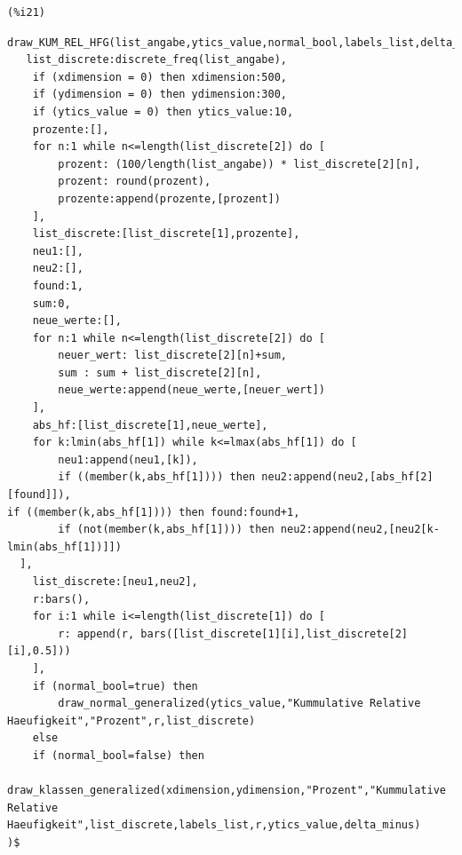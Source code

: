 \documentclass{article}
\begin{document}
\noindent
\begin{minipage}[t]{8ex}{\color{red}\bf
\begin{verbatim}
(%i21) 
\end{verbatim}}
\end{minipage}
\begin{minipage}[t]{\textwidth}{\color{blue}
\begin{verbatim}
draw_KUM_REL_HFG(list_angabe,ytics_value,normal_bool,labels_list,delta_minus,xdimension,ydimension):=block(
   list_discrete:discrete_freq(list_angabe),
    if (xdimension = 0) then xdimension:500,
    if (ydimension = 0) then ydimension:300,
    if (ytics_value = 0) then ytics_value:10,
    prozente:[],
    for n:1 while n<=length(list_discrete[2]) do [
        prozent: (100/length(list_angabe)) * list_discrete[2][n],
        prozent: round(prozent),
        prozente:append(prozente,[prozent])
    ],
    list_discrete:[list_discrete[1],prozente],
    neu1:[],
    neu2:[],
    found:1,
    sum:0,
    neue_werte:[],
    for n:1 while n<=length(list_discrete[2]) do [
        neuer_wert: list_discrete[2][n]+sum,
        sum : sum + list_discrete[2][n],
        neue_werte:append(neue_werte,[neuer_wert])
    ],
    abs_hf:[list_discrete[1],neue_werte],
    for k:lmin(abs_hf[1]) while k<=lmax(abs_hf[1]) do [
        neu1:append(neu1,[k]),
        if ((member(k,abs_hf[1]))) then neu2:append(neu2,[abs_hf[2][found]]),
if ((member(k,abs_hf[1]))) then found:found+1,
        if (not(member(k,abs_hf[1]))) then neu2:append(neu2,[neu2[k-lmin(abs_hf[1])]])
  ],  
    list_discrete:[neu1,neu2],
    r:bars(),
    for i:1 while i<=length(list_discrete[1]) do [
        r: append(r, bars([list_discrete[1][i],list_discrete[2][i],0.5]))
    ],
    if (normal_bool=true) then
        draw_normal_generalized(ytics_value,"Kummulative Relative Haeufigkeit","Prozent",r,list_discrete)
    else
    if (normal_bool=false) then
        draw_klassen_generalized(xdimension,ydimension,"Prozent","Kummulative Relative Haeufigkeit",list_discrete,labels_list,r,ytics_value,delta_minus)
)$
\end{verbatim}}
\end{minipage}
\end{document}

